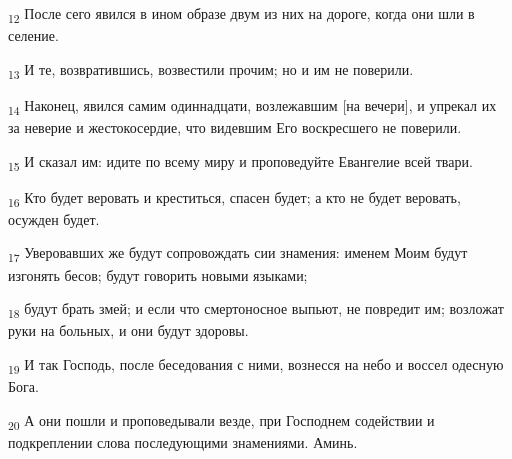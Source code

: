 \begin{tcolorbox}
\textsubscript{12} После сего явился в ином образе двум из них на дороге, когда они шли в селение.
\end{tcolorbox}
\begin{tcolorbox}
\textsubscript{13} И те, возвратившись, возвестили прочим; но и им не поверили.
\end{tcolorbox}
\begin{tcolorbox}
\textsubscript{14} Наконец, явился самим одиннадцати, возлежавшим [на вечери], и упрекал их за неверие и жестокосердие, что видевшим Его воскресшего не поверили.
\end{tcolorbox}
\begin{tcolorbox}
\textsubscript{15} И сказал им: идите по всему миру и проповедуйте Евангелие всей твари.
\end{tcolorbox}
\begin{tcolorbox}
\textsubscript{16} Кто будет веровать и креститься, спасен будет; а кто не будет веровать, осужден будет.
\end{tcolorbox}
\begin{tcolorbox}
\textsubscript{17} Уверовавших же будут сопровождать сии знамения: именем Моим будут изгонять бесов; будут говорить новыми языками;
\end{tcolorbox}
\begin{tcolorbox}
\textsubscript{18} будут брать змей; и если что смертоносное выпьют, не повредит им; возложат руки на больных, и они будут здоровы.
\end{tcolorbox}
\begin{tcolorbox}
\textsubscript{19} И так Господь, после беседования с ними, вознесся на небо и воссел одесную Бога.
\end{tcolorbox}
\begin{tcolorbox}
\textsubscript{20} А они пошли и проповедывали везде, при Господнем содействии и подкреплении слова последующими знамениями. Аминь.
\end{tcolorbox}
